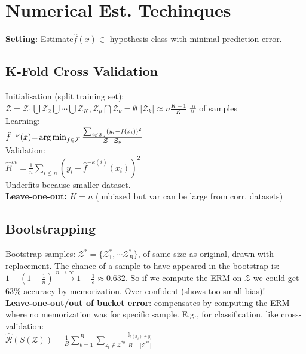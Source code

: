 \section*{Numerical Est. Techinques}
\textbf{Setting}: Estimate$\hat{f}(x) \in $ hypothesis class with minimal prediction error.

\subsection*{K-Fold Cross Validation}
Initialisation (split training set):\\
$\mathcal{Z}=\mathcal{Z}_1\bigcup\mathcal{Z}_2\bigcup\cdots\bigcup\mathcal{Z}_K, \mathcal{Z}_\mu \bigcap\mathcal{Z}_\nu = \emptyset $
$|\mathcal{Z}_k|\approx n\frac{K-1}{K}$ \# of samples\\
Learning:\\
$\hat{f}^{-\nu}(x){=}
\operatorname*{arg\,min}_{f\in\mathcal{F}}\frac{\sum_{i\not\in\mathcal{Z}_\nu}(y_i-f(x_i))^2}{|\mathcal{Z}-\mathcal{Z}_{\nu}|}$\\
Validation:\\
$\hat{R}^{cv} = \frac{1}{n}\sum_{i\leq n}(y_i-\hat{f}^{-\kappa(i)}(x_i))^2$\\
Underfits because smaller dataset.\\
\textbf{Leave-one-out:} $K=n$ (unbiased but var can be large from corr. datasets)
\subsection*{Bootstrapping}
Bootstrap samples: $\mathcal{Z}^*=\{\mathcal{Z}_1^*, \cdots\mathcal{Z}_B^*\}$, of same size as original, drawn with replacement.
The chance of a sample to have appeared in the bootstrap is:\\
$1-(1-\frac{1}{n})\stackrel{n\to\infty}{\to} 1-\frac{1}{e}\approx 0.632$. So if we compute the ERM on $\mathcal{Z}$ we could get 63\% accuracy by memorization. Over-confident (shows too small bias)!\\
\textbf{Leave-one-out/out of bucket error}: compensates by computing the ERM where no memorization was for specific sample. E.g., for classification, like cross-validation:\\
$\hat{\mathcal{R}}(S(\mathcal{Z}))=\frac{1}{B}\sum_{b=1}^B\sum_{z_i\not\in\mathcal{Z}^{*b}}\frac{\mathbb{I}_{c(x_i)\neq y_i}}{B-\lvert\mathcal{Z}^{*b}\rvert}$

